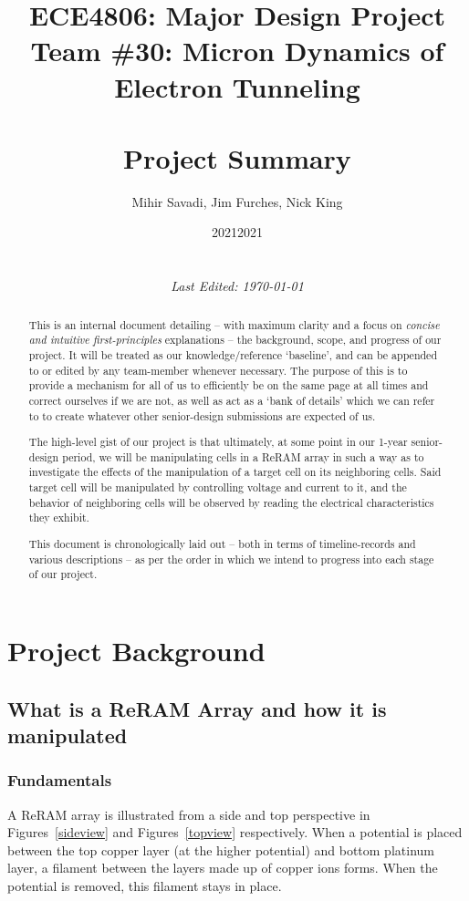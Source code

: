 \documentclass{article}
\date{2021}
\title{ECE4806: Major Design Project \\ Team \#30: Micron Dynamics of Electron Tunneling \\ \phantom{spacer} \\
  \textbf{Project Summary}}
\author{Mihir Savadi, Jim Furches, Nick King}
\date{2021 \\ \phantom{spacer} \\ \phantom{spacer} \\ \textit{Last Edited: \today}}
\begin{document}
    \maketitle

    \renewcommand{\abstractname}{Purpose}
    \begin{abstract}
        This is an internal document detailing -- with maximum clarity and a focus on \textit{concise and intuitive
        first-principles} explanations -- the background, scope, and progress of our project. It will be treated as our
        knowledge/reference `baseline', and can be appended to or edited by any team-member whenever necessary. The
        purpose of this is to provide a mechanism for all of us to efficiently be on the same page at all times and
        correct ourselves if we are not, as well as act as a `bank of details' which we can refer to to create whatever
        other senior-design submissions are expected of us.

        The high-level gist of our project is that ultimately, at some point in our 1-year senior-design period, we will
        be manipulating cells in a ReRAM array in such a way as to investigate the effects of the manipulation of a
        target cell on its neighboring cells. Said target cell will be manipulated by controlling voltage and current to
        it, and the behavior of neighboring cells will be observed by reading the electrical characteristics they
        exhibit.

        This document is chronologically laid out -- both in terms of timeline-records and various descriptions -- as
        per the order in which we intend to progress into each stage of our project.
    \end{abstract}

    \newpage
    \tableofcontents
    
    \newpage
    \section{Project Background}
          
      \subsection{What is a ReRAM Array and how it is manipulated}

        \subsubsection{Fundamentals}
          A ReRAM array is illustrated from a side and top perspective in Figures~\ref{sideview} and
          Figures~\ref{topview} respectively. When a potential is placed between the top copper layer (at the higher
          potential) and bottom platinum layer, a filament between the layers made up of copper ions forms. When the
          potential is removed, this filament stays in place.
\end{document}
